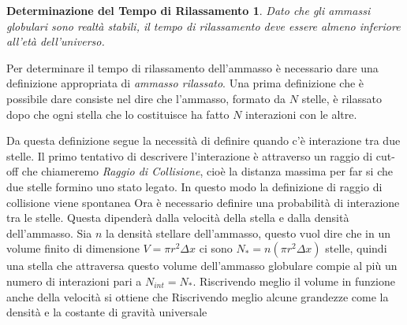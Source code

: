 \newtheorem*{mydef7}{Determinazione del Tempo di Rilassamento}
\begin{mydef7}
	Dato che gli ammassi globulari sono realt\`a stabili, il tempo di rilassamento deve essere almeno inferiore all'et\`a dell'universo.
\end{mydef7}
Per determinare il tempo di rilassamento dell'ammasso \`e necessario dare una definizione appropriata di \emph{ammasso rilassato}. Una prima definizione che \`e possibile dare consiste nel dire che l'ammasso, formato da $N$ stelle, \`e rilassato dopo che ogni stella che lo costituisce ha fatto $N$ interazioni con le altre.

Da questa definizione segue la necessit\`a di definire quando c'\`e interazione tra due stelle. 
Il primo tentativo di descrivere l'interazione \`e attraverso un raggio di cut-off che chiameremo \emph{Raggio di Collisione}, cio\`e la distanza massima per far si che due stelle formino uno stato legato. In questo modo la definizione di raggio di collisione viene spontanea
Ora \`e necessario definire una probabilit\`a di interazione tra le stelle. Questa dipender\`a dalla velocit\`a della stella e dalla densit\`a dell'ammasso. Sia $n$ la densit\`a stellare dell'ammasso, questo vuol dire che in un volume finito di dimensione $V=\pi r^2 \Delta x$ ci sono $N_{*}=n(\pi r^2 \Delta x)$ stelle, quindi una stella che attraversa questo volume dell'ammasso globulare compie al pi\`u un numero di interazioni pari a $N_{int} = N_{*}$. Riscrivendo meglio il volume in funzione anche della velocit\`a si ottiene che
Riscrivendo meglio alcune grandezze come la densit\`a  e la costante di gravit\`a universale












